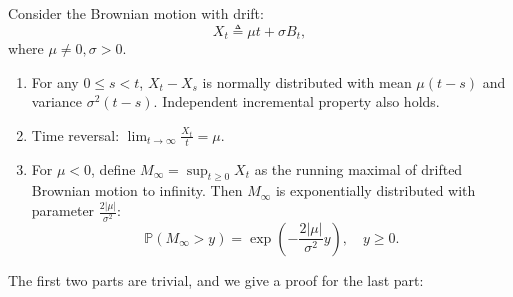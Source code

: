 \begin{theorem}
Consider the Brownian motion with drift:
\[
X_t\triangleq \mu t + \sigma B_t,
\]
where $\mu\ne0,\sigma>0$.
\begin{enumerate}
\item
For any $0\le s<t$, $X_t-X_s$ is normally distributed with mean $\mu(t-s)$ and variance $\sigma^2(t-s)$. Independent incremental property also holds.
\item
Time reversal: $\lim_{t\to\infty}\frac{X_t}{t}=\mu$.
\item
For $\mu<0$, define $M_\infty=\sup_{t\ge0}X_t$ as the running maximal of drifted Brownian motion to infinity. Then $M_\infty$ is exponentially distributed with parameter $\frac{2|\mu|}{\sigma^2}$:
\[
\mathbb{P}(M_\infty>y)=\exp\left(-\frac{2|\mu|}{\sigma^2}y\right),\quad y\ge0.
\]
\end{enumerate}
\end{theorem}
The first two parts are trivial, and we give a proof for the last part:

